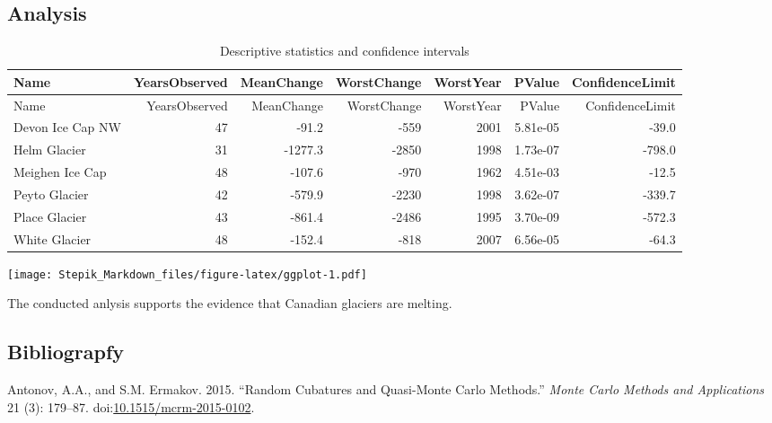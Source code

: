 \documentclass[]{article}
\begin{document}
\subsection{Analysis}\label{analysis}

\begin{longtable}[]{@{}lrrrrrr@{}}
\caption{Descriptive statistics and confidence intervals}\tabularnewline
\toprule
Name & YearsObserved & MeanChange & WorstChange & WorstYear & PValue &
ConfidenceLimit\tabularnewline
\midrule
\endfirsthead
\toprule
Name & YearsObserved & MeanChange & WorstChange & WorstYear & PValue &
ConfidenceLimit\tabularnewline
\midrule
\endhead
Devon Ice Cap NW & 47 & -91.2 & -559 & 2001 & 5.81e-05 &
-39.0\tabularnewline
Helm Glacier & 31 & -1277.3 & -2850 & 1998 & 1.73e-07 &
-798.0\tabularnewline
Meighen Ice Cap & 48 & -107.6 & -970 & 1962 & 4.51e-03 &
-12.5\tabularnewline
Peyto Glacier & 42 & -579.9 & -2230 & 1998 & 3.62e-07 &
-339.7\tabularnewline
Place Glacier & 43 & -861.4 & -2486 & 1995 & 3.70e-09 &
-572.3\tabularnewline
White Glacier & 48 & -152.4 & -818 & 2007 & 6.56e-05 &
-64.3\tabularnewline
\bottomrule
\end{longtable}

\texttt{[image: Stepik\_Markdown\_files/figure-latex/ggplot-1.pdf]}

The conducted anlysis supports the evidence that Canadian glaciers are
melting.

\subsection*{Bibliograpfy}\label{bibliograpfy}

\hypertarget{refs}{}
\hypertarget{ref-AntonovErmakov_RandsmCubaturesQMC}{}
Antonov, A.A., and S.M. Ermakov. 2015. ``Random Cubatures and
Quasi-Monte Carlo Methods.'' \emph{Monte Carlo Methods and Applications}
21 (3): 179--87.
doi:\href{https://doi.org/10.1515/mcrm-2015-0102}{10.1515/mcrm-2015-0102}.
\end{document}
